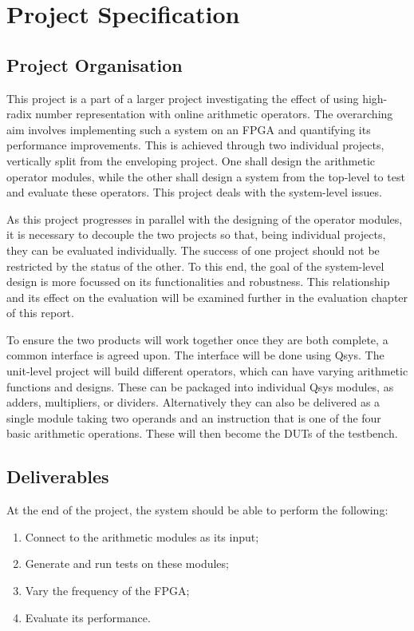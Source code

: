 \section{Project Specification}

\subsection{Project Organisation}
This project is a part of a larger project investigating the effect of using
high-radix number representation with online arithmetic operators.
The overarching aim involves implementing such a system on an FPGA and
quantifying its performance improvements.
This is achieved through two individual projects, vertically split from
the enveloping project.
One shall design the arithmetic operator modules,
while the other shall design a system from the top-level to test and
evaluate these operators.
This project deals with the system-level issues.

As this project progresses in parallel with the designing of the operator
modules, it is necessary to decouple the two projects so that, being individual
projects, they can be evaluated individually.
The success of one project should not be restricted by the status of the other.
To this end, the goal of the system-level design is more focussed on its
functionalities and robustness.
This relationship and its effect on the evaluation will be examined further in
the evaluation chapter of this report.

To ensure the two products will work together once they are both complete, a
common interface is agreed upon.
The interface will be done using Qsys.
The unit-level project will build different operators, which can have varying
arithmetic functions and designs.
These can be packaged into individual Qsys modules, as adders, multipliers,
or dividers.
Alternatively they can also be delivered as a single module taking two operands
and an instruction that is one of the four basic arithmetic operations.
These will then become the DUTs of the testbench.

\subsection{Deliverables}
At the end of the project, the system should be able to perform the following:
\begin{enumerate}
  \item Connect to the arithmetic modules as its input;
  \item Generate and run tests on these modules;
  \item Vary the frequency of the FPGA;
  \item Evaluate its performance.
\end{enumerate}

